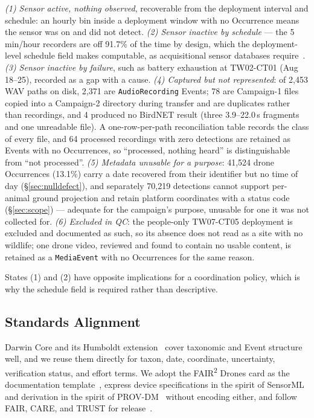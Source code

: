 \documentclass[sigconf]{acmart}
\begin{document}
\emph{(1) Sensor active, nothing observed}, recoverable from the
deployment interval and schedule: an hourly bin inside a deployment
window with no Occurrence means the sensor was on and did not detect.
\emph{(2) Sensor inactive by schedule} --- the 5\,min/hour recorders are
off 91.7\% of the time by design, which the deployment-level schedule
field makes computable, as acquisitional sensor
databases require~\cite{madden2005tinydb}. \emph{(3) Sensor inactive by failure}, such as
battery exhaustion at TW02-CT01 (Aug 18--25), recorded as a gap with a
cause. \emph{(4) Captured but not represented}: of 2{,}453 WAV paths on
disk, 2{,}371 are \texttt{AudioRecording} Events; 78 are Campaign-1
files copied into a Campaign-2 directory during transfer and are
duplicates rather than recordings, and 4 produced no BirdNET result
(three 3.9--22.0\,s fragments and one unreadable file). A one-row-per-path
reconciliation table records the class of every file, and 64 processed
recordings with zero detections are retained as Events with no
Occurrences, so ``processed, nothing heard'' is distinguishable from
``not processed''.
\emph{(5) Metadata unusable for a purpose}: 41{,}524 drone Occurrences
(13.1\%) carry a date recovered from their identifier but no time of
day (\S\ref{sec:nulldefect}), and separately
70{,}219 detections cannot support per-animal ground projection and
retain platform coordinates with a status code (\S\ref{sec:scope}) ---
adequate for the campaign's purpose, unusable for one it was not
collected for. \emph{(6) Excluded in QC}: the people-only TW07-CT05
deployment is excluded and documented as such, so its absence does not
read as a site with no wildlife; one drone video, reviewed and found to
contain no usable content, is retained as a \texttt{MediaEvent} with no
Occurrences for the same reason.

States (1) and (2) have opposite implications for a coordination policy,
which is why the schedule field is required rather than descriptive.

\subsection{Standards Alignment}
\label{sec:crosswalk}

Darwin Core and its Humboldt extension~\cite{tdwgHumboldt} cover
taxonomic and Event structure well, and we reuse them directly for
taxon, date, coordinate, uncertainty, verification status, and effort
terms. We adopt the FAIR\textsuperscript{2} Drones card as the
documentation template~\cite{pierrat2025proximal}, express device
specifications in the spirit of SensorML~\cite{ogcSensorML} and
derivation in the spirit of PROV-DM~\cite{w3cProvDM} without encoding
either, and follow FAIR, CARE, and TRUST for
release~\cite{wilkinson2016fair,carroll2020care,lin2020trust}.
\end{document}
